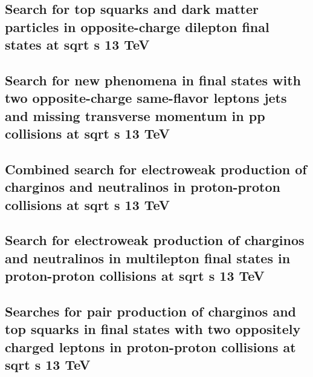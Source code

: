 \documentclass[a4paper, 11pt, twoside, openright]{report}
\begin{document}
\subsection{Search for top squarks and dark matter particles in opposite-charge dilepton final states at sqrt s 13 TeV}


\subsection{Search for new phenomena in final states with two opposite-charge same-flavor leptons jets and missing transverse momentum in pp collisions at sqrt s 13 TeV}


\subsection{Combined search for electroweak production of charginos and neutralinos in proton-proton collisions at sqrt s 13 TeV}


\subsection{Search for electroweak production of charginos and neutralinos in multilepton final states in proton-proton collisions at sqrt s 13 TeV}


\subsection{Searches for pair production of charginos and top squarks in final states with two oppositely charged leptons in proton-proton collisions at sqrt s 13 TeV}

\end{document}
